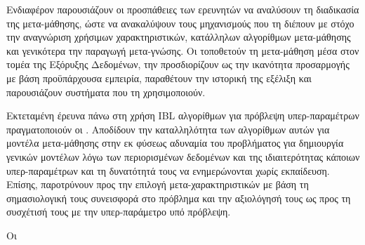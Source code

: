 Ενδιαφέρον παρουσιάζουν οι προσπάθειες των ερευνητών να αναλύσουν τη διαδικασία της μετα-μάθησης, ώστε να ανακαλύψουν τους μηχανισμούς που τη διέπουν με στόχο την αναγνώριση χρήσιμων χαρακτηριστικών, κατάλληλων αλγορίθμων μετα-μάθησης και γενικότερα την παραγωγή μετα-γνώσης. Οι \citet{Brazdil2009} τοποθετούν τη μετα-μάθηση μέσα στον τομέα της Εξόρυξης Δεδομένων, την προσδιορίζουν ως την ικανότητα προσαρμογής με βάση προϋπάρχουσα εμπειρία, παραθέτουν την ιστορική της εξέλιξη και παρουσιάζουν συστήματα που τη χρησιμοποιούν.

Εκτεταμένη έρευνα πάνω στη χρήση \gls{IBL} αλγορίθμων για πρόβλεψη υπερ-παραμέτρων πραγματοποιούν οι \citet{Abdulrahman:2014:MCA:3015544.3015557}. Αποδίδουν την καταλληλότητα των αλγορίθμων αυτών για μοντέλα μετα-μάθησης στην εκ φύσεως αδυναμία του προβλήματος για δημιουργία γενικών μοντέλων λόγω των περιορισμένων δεδομένων και της ιδιαιτερότητας κάποιων υπερ-παραμέτρων και τη δυνατότητά τους να ενημερώνονται χωρίς εκπαίδευση. Επίσης, παροτρύνουν προς την επιλογή μετα-χαρακτηριστικών με βάση τη σημασιολογική τους συνεισφορά στο πρόβλημα και την αξιολόγησή τους ως προς τη συσχέτισή τους με την υπερ-παράμετρο υπό πρόβλεψη. 

Οι \citet{} 